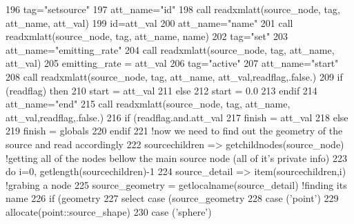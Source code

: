 \begin{DoxyCode}
196         tag=\textcolor{stringliteral}{"setsource"}
197         att\_name=\textcolor{stringliteral}{"id"}
198         \textcolor{keyword}{call }readxmlatt(source\_node, tag, att\_name, att\_val)
199         id=att\_val%
200         att\_name=\textcolor{stringliteral}{"name"}
201         \textcolor{keyword}{call }readxmlatt(source\_node, tag, att\_name, name)
202         tag=\textcolor{stringliteral}{"set"}
203         att\_name=\textcolor{stringliteral}{"emitting\_rate"}
204         \textcolor{keyword}{call }readxmlatt(source\_node, tag, att\_name, att\_val)
205         emitting\_rate = att\_val%
206         tag=\textcolor{stringliteral}{"active"}
207         att\_name=\textcolor{stringliteral}{"start"}
208         \textcolor{keyword}{call }readxmlatt(source\_node, tag, att\_name, att\_val,readflag,.false.)
209         \textcolor{keywordflow}{if} (readflag) \textcolor{keywordflow}{then}
210             start = att\_val%
211         \textcolor{keywordflow}{else}
212             start = 0.0
213 \textcolor{keywordflow}{        endif}
214         att\_name=\textcolor{stringliteral}{"end"}
215         \textcolor{keyword}{call }readxmlatt(source\_node, tag, att\_name, att\_val,readflag,.false.)
216         \textcolor{keywordflow}{if} (readflag.and.att\_val%
217             finish = att\_val%
218         \textcolor{keywordflow}{else}
219             finish = globals%
220 \textcolor{keywordflow}{        endif}
221         \textcolor{comment}{!now we need to find out the geometry of the source and read accordingly}
222         sourcechildren => getchildnodes(source\_node) \textcolor{comment}{!getting all of the nodes bellow the main source node
       (all of it's private info)}
223         \textcolor{keywordflow}{do} i=0, getlength(sourcechildren)-1
224             source\_detail => item(sourcechildren,i) \textcolor{comment}{!grabing a node}
225             source\_geometry = getlocalname(source\_detail)  \textcolor{comment}{!finding its name}
226             \textcolor{keywordflow}{if} (geometry%
227                 \textcolor{keywordflow}{select case} (source\_geometry%
228                 \textcolor{keywordflow}{case} (\textcolor{stringliteral}{'point'})
229                     \textcolor{keyword}{allocate}(point::source\_shape)
230                 \textcolor{keywordflow}{case} (\textcolor{stringliteral}{'sphere'})

\end{DoxyCode}
